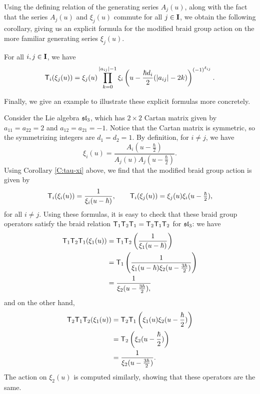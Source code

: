Using the defining relation of the generating series $A_j(u)$, along with the fact that the series $A_j(u)$ and $\xi_j(u)$ commute for all $j\in\mathbf{I}$, we obtain the following corollary, giving us an explicit formula for the modified braid group action on the more familiar generating series $\xi_j(u)$.

\begin{corollary}\label{C:tau-xi}
    For all $i,j\in\mathbf{I}$, we have
    \[\mathsf{T}_i(\xi_j(u)) = \xi_j(u)\prod_{k=0}^{\lvert a_{ij}\rvert-1} \xi_i\left(u-\frac{\hbar d_i}{2}(\lvert a_{ij}\rvert-2k)\right)^{(-1)^{\delta_{ij}}}.\]
\end{corollary}

Finally, we give an example to illustrate these explicit formulas more concretely.

\begin{example}\label{E:sl3-mbraid-action}
    Consider the Lie algebra $\mathfrak{sl}_3$, which has $2\times 2$ Cartan matrix given by $a_{11}=a_{22}=2$ and $a_{12}=a_{21}=-1$.
    Notice that the Cartan matrix is symmetric, so the symmetrizing integers are $d_1=d_2=1$.
    By definition, for $i\neq j$, we have
    \[\xi_i(u) = \frac{A_i(u-\frac{\hbar}{2})}{A_j(u)A_j(u-\frac{\hbar}{2})}.\]
    Using Corollary \ref{C:tau-xi} above, we find that the modified braid group action is given by
    \[\mathsf{T}_i(\xi_i(u)) = \frac{1}{\xi_i(u-\hbar)}, \qquad
    \mathsf{T}_i(\xi_j(u)) = \xi_j(u)\xi_i(u-\tfrac{\hbar}{2}),\]
    for all $i\neq j$.
    Using these formulas, it is easy to check that these braid group operators satisfy the braid relation $\mathsf{T}_1\mathsf{T}_2\mathsf{T}_1 = \mathsf{T}_2\mathsf{T}_1\mathsf{T}_2$ for $\mathfrak{sl}_3$: we have
    \begin{align*}
        \mathsf{T}_1\mathsf{T}_2\mathsf{T}_1(\xi_1(u)) &= \mathsf{T}_1\mathsf{T}_2\left(\frac{1}{\xi_1(u-\hbar)}\right) \\
        &= \mathsf{T}_1\left(\frac{1}{\xi_1(u-\hbar)\xi_2(u-\frac{3\hbar}{2})}\right) \\
        &= \frac{1}{\xi_2(u-\frac{3\hbar}{2}),}
    \end{align*}
    and on the other hand,
    \begin{align*}
        \mathsf{T}_2\mathsf{T}_1\mathsf{T}_2(\xi_1(u)) &= \mathsf{T}_2\mathsf{T}_1\left(\xi_1(u)\xi_2(u-\frac{\hbar}{2})\right) \\
        &= \mathsf{T}_2\left(\xi_2(u-\frac{\hbar}{2})\right) \\
        &= \frac{1}{\xi_2(u-\frac{3\hbar}{2})}.
    \end{align*}
    The action on $\xi_2(u)$ is computed similarly, showing that these operators are the same.
\end{example}


